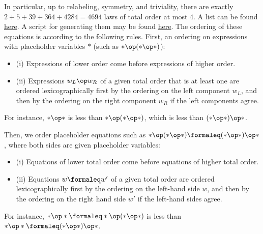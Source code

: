 In particular, up to relabeling, symmetry, and triviality, there are exactly $2+5+39+364+4284=4694$ laws of total order at most $4$. A list can be found \href{https://github.com/teorth/equational_theories/blob/main/data/equations.txt}{here}. A script for generating them may be found \href{https://github.com/teorth/equational_theories/blob/main/scripts/generate_eqs_list.py}{here}. The ordering of these equations is according to the following rules.
First, an ordering on expressions with placeholder variables $\ast$ (such as $\ast \op (\ast \op \ast)$):
\begin{itemize}
\item (i)  Expressions of lower order come before expressions of higher order.
\item (ii) Expressions $w_L \op w_R$ of a given total order that is at least one are ordered lexicographically first by the ordering on the left component $w_L$, and then by the ordering on the right component $w_R$ if the left components agree.
\end{itemize}
For instance, $\ast \op \ast$ is less than $\ast \op (\ast \op \ast)$, which is less than $(\ast \op \ast) \op \ast$.

Then, we order placeholder equations such as $\ast \op (\ast \op \ast) \formaleq (\ast \op \ast) \op \ast$, where both sides are given placeholder variables:
\begin{itemize}
\item (i)  Equations of lower total order come before equations of higher total order.
\item (ii) Equations $w \formaleq w'$ of a given total order are ordered lexicographically first by the ordering on the left-hand side $w$, and then by the ordering on the right hand side $w'$ if the left-hand sides agree.
\end{itemize}
For instance, $\ast \op \ast \formaleq \ast \op (\ast \op \ast)$ is less than $\ast \op \ast \formaleq (\ast \op \ast) \op \ast$.

